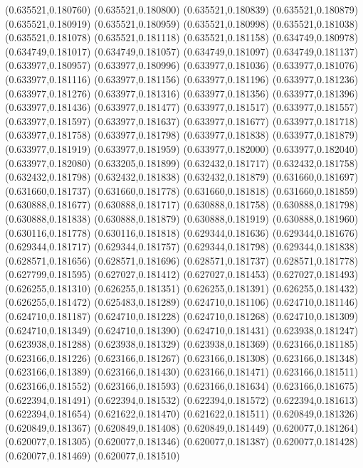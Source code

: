 (0.635521,0.180760)
(0.635521,0.180800)
(0.635521,0.180839)
(0.635521,0.180879)
(0.635521,0.180919)
(0.635521,0.180959)
(0.635521,0.180998)
(0.635521,0.181038)
(0.635521,0.181078)
(0.635521,0.181118)
(0.635521,0.181158)
(0.634749,0.180978)
(0.634749,0.181017)
(0.634749,0.181057)
(0.634749,0.181097)
(0.634749,0.181137)
(0.633977,0.180957)
(0.633977,0.180996)
(0.633977,0.181036)
(0.633977,0.181076)
(0.633977,0.181116)
(0.633977,0.181156)
(0.633977,0.181196)
(0.633977,0.181236)
(0.633977,0.181276)
(0.633977,0.181316)
(0.633977,0.181356)
(0.633977,0.181396)
(0.633977,0.181436)
(0.633977,0.181477)
(0.633977,0.181517)
(0.633977,0.181557)
(0.633977,0.181597)
(0.633977,0.181637)
(0.633977,0.181677)
(0.633977,0.181718)
(0.633977,0.181758)
(0.633977,0.181798)
(0.633977,0.181838)
(0.633977,0.181879)
(0.633977,0.181919)
(0.633977,0.181959)
(0.633977,0.182000)
(0.633977,0.182040)
(0.633977,0.182080)
(0.633205,0.181899)
(0.632432,0.181717)
(0.632432,0.181758)
(0.632432,0.181798)
(0.632432,0.181838)
(0.632432,0.181879)
(0.631660,0.181697)
(0.631660,0.181737)
(0.631660,0.181778)
(0.631660,0.181818)
(0.631660,0.181859)
(0.630888,0.181677)
(0.630888,0.181717)
(0.630888,0.181758)
(0.630888,0.181798)
(0.630888,0.181838)
(0.630888,0.181879)
(0.630888,0.181919)
(0.630888,0.181960)
(0.630116,0.181778)
(0.630116,0.181818)
(0.629344,0.181636)
(0.629344,0.181676)
(0.629344,0.181717)
(0.629344,0.181757)
(0.629344,0.181798)
(0.629344,0.181838)
(0.628571,0.181656)
(0.628571,0.181696)
(0.628571,0.181737)
(0.628571,0.181778)
(0.627799,0.181595)
(0.627027,0.181412)
(0.627027,0.181453)
(0.627027,0.181493)
(0.626255,0.181310)
(0.626255,0.181351)
(0.626255,0.181391)
(0.626255,0.181432)
(0.626255,0.181472)
(0.625483,0.181289)
(0.624710,0.181106)
(0.624710,0.181146)
(0.624710,0.181187)
(0.624710,0.181228)
(0.624710,0.181268)
(0.624710,0.181309)
(0.624710,0.181349)
(0.624710,0.181390)
(0.624710,0.181431)
(0.623938,0.181247)
(0.623938,0.181288)
(0.623938,0.181329)
(0.623938,0.181369)
(0.623166,0.181185)
(0.623166,0.181226)
(0.623166,0.181267)
(0.623166,0.181308)
(0.623166,0.181348)
(0.623166,0.181389)
(0.623166,0.181430)
(0.623166,0.181471)
(0.623166,0.181511)
(0.623166,0.181552)
(0.623166,0.181593)
(0.623166,0.181634)
(0.623166,0.181675)
(0.622394,0.181491)
(0.622394,0.181532)
(0.622394,0.181572)
(0.622394,0.181613)
(0.622394,0.181654)
(0.621622,0.181470)
(0.621622,0.181511)
(0.620849,0.181326)
(0.620849,0.181367)
(0.620849,0.181408)
(0.620849,0.181449)
(0.620077,0.181264)
(0.620077,0.181305)
(0.620077,0.181346)
(0.620077,0.181387)
(0.620077,0.181428)
(0.620077,0.181469)
(0.620077,0.181510)
